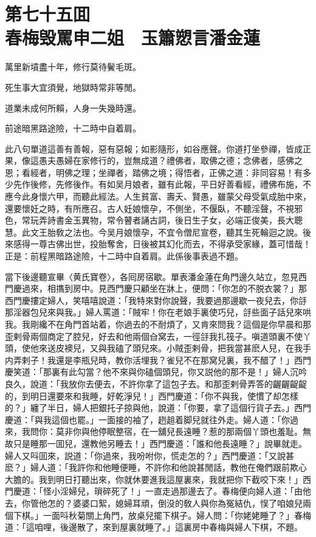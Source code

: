 
\chapter*{第七十五囬　\\春梅毁罵申二姐　玉簫愬言潘金蓮}


\begin{myquote}
萬里新墳盡十年，修行莫待鬢毛斑。

死生事大宜須覺，地獄時常非等閒。

道業未成何所賴，人身一失幾時還。

前途暗黑路途險，十二時中自着肩。
\end{myquote}

此八句單道這善有善報，惡有惡報；如影隨形，如谷應聲。你道打坐參禪，皆成正果，像這愚夫愚婦在家修行的，豈無成道？禮佛者，取佛之德；念佛者，感佛之恩；看經者，明佛之理；坐禪者，踏佛之境；得悟者，正佛之道：非同容易！有多少先作後修，先修後作。有如吴月娘者，雖有此報，平日好善看經，禮佛布施，不應今此身懷六甲，而聽此經法。人生貧富、壽夭、賢愚，雖蒙父母受氣成胎中來，還要懷妊之時，有所應召。古人妊娘懷孕，不側坐，不偃臥，不聽淫聲，不視邪色，常玩弄詩書金玉異物，常令瞽者誦古詞，後日生子女，必端正俊美，長大聰慧。此文王胎敎之法也。今吴月娘懷孕，不宜令僧尼宣卷，聽其生死輪迴之說。後來感得一尊古佛出世，投胎奪舍，日後被其幻化而去，不得承受家緣，蓋可惜哉！正是：前程黑暗路途險，十二時中自着肩。此係後事表過不題。

當下後邊聽宣畢〈黄氏寶卷〉，各囘房宿歇。單表潘金蓮在角門邊久站立，忽見西門慶過來，相㩦到房中。見西門慶只顧坐在牀上，便問：「你怎的不脱衣裳？」那西門慶摟定婦人，笑嘻嘻說道：「我特來對你說聲，我要過那邊歇一夜兒去，你㧱那淫器包兒來與我。」婦人罵道：「賊牢！你在老娘手裏使巧兒，㧱些面子話兒來哄我。我剛纔不在角門首站着，你過去的不耐煩了，又肯來問我？這個是你早晨和那歪剌骨兩個商定了腔兒，好去和他兩個㒲窝去，一徑㧱我扎筏子。嗔道頭裏不使丫頭，使他來送皮襖兒，又與我磕了頭兒來。小賊歪剌骨，把我當甚麽人兒，在我手内弄剌子！我還是李瓶兒時，教你活埋我？雀兒不在那窝兒裏，我不醋了！」西門慶笑道：「那裏有此勾當？他不來與你磕個頭兒，你又説他的那不是！」婦人沉吟良久，說道：「我放你去便去，不許你拿了這包子去。和那歪剌骨弄答的齷齷齪齪的，到明日還要來和我睡，好乾淨兒！」西門慶道：「你不與我，使慣了却怎樣的？」纏了半日，婦人把銀托子掠與他，說道：「你要，拿了這個行貨子去。」西門慶道：「與我這個也罷。」一面接的袖了，趔趄着脚兒就往外走。婦人道：「你過來，我問你：莫非你與他停眠整宿，在一舖兒長遠睡？惹的那兩個丫頭也羞耻。無故只是睡那一囬兒，還教他另睡去！」西門慶道：「誰和他長遠睡？」說畢就走。婦人又呌囬來，説道：「你過來，我吩咐你，慌走怎的？」西門慶道：「又說甚麽？」婦人道：「我許你和他睡便睡，不許你和他說甚閒話，教他在俺們跟前欺心大膽的。我到明日打聽出來，你就休要進我這屋裏來，我就把你下截咬下來！」西門慶道：「怪小淫婦兒，瑣碎死了！」一直走過那邊去了。春梅便向婦人道：「由他去，你管他怎的？婆婆口絮，媳婦耳頑，倒没的敎人與你為冤結仇，悮了咱娘兒兩個下棋。」一面呌秋菊關上角門，放桌兒擺下棋子。婦人問：「你姥姥睡了？」春梅道：「這咱哩，後邊散了，來到屋裏就睡了。」這裏房中春梅與婦人下棋，不題。

